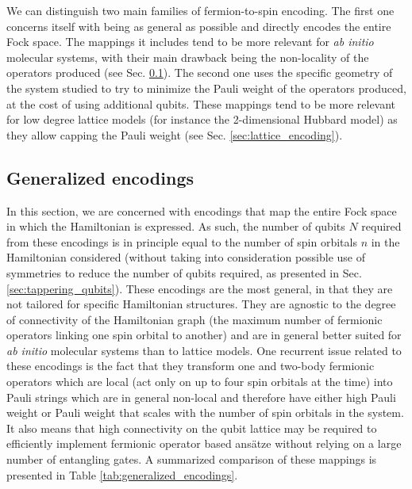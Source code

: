 We can distinguish two main families of fermion-to-spin encoding. The first one concerns itself with being as general as possible and directly encodes the entire Fock space. The mappings it includes tend to be more relevant for \textit{ab initio} molecular systems, with their main drawback being the non-locality of the operators produced (see Sec. \ref{sec:gen_encoding}). The second one uses the specific geometry of the system studied to try to minimize the Pauli weight of the operators produced, at the cost of using additional qubits. These mappings tend to be more relevant for low degree lattice models (for instance the 2-dimensional Hubbard model) as they allow capping the Pauli weight (see Sec. \ref{sec:lattice_encoding}).

\subsection{Generalized encodings} \label{sec:gen_encoding}

In this section, we are concerned with encodings that map the entire Fock space in which the Hamiltonian is expressed. As such, the number of qubits $N$ required from these encodings is in principle equal to the number of spin orbitals $n$ in the Hamiltonian considered (without taking into consideration possible use of symmetries to reduce the number of qubits required, as presented in Sec. \ref{sec:tappering_qubits}). These encodings are the most general, in that they are not tailored for specific Hamiltonian structures. They are agnostic to the degree of connectivity of the Hamiltonian graph (the maximum number of fermionic operators linking one spin orbital to another) and are in general better suited for \textit{ab initio} molecular systems than to lattice models. One recurrent issue related to these encodings is the fact that they transform one and two-body fermionic operators which are local (act only on up to four spin orbitals at the time) into Pauli strings which are in general non-local and therefore have either high Pauli weight or Pauli weight that scales with the number of spin orbitals in the system. It also means that high connectivity on the qubit lattice may be required to efficiently implement fermionic operator based ans{\"{a}}tze without relying on a large number of entangling gates. A summarized comparison of these mappings is presented in Table \ref{tab:generalized_encodings}.

